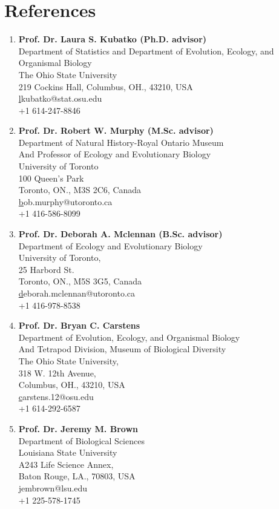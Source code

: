 \documentclass[11pt,letterpaper,sans]{moderncv} %
\begin{document}
\section{References}
\begin{enumerate}

\item \textbf{Prof. Dr. Laura S. Kubatko (Ph.D. advisor)}\\Department of Statistics and Department of Evolution, Ecology, and Organismal Biology\\The Ohio State University\\219 Cockins Hall, Columbus, OH., 43210, USA\\\href{lkubatko@stat.osu.edu}lkubatko@stat.osu.edu\\+1 614-247-8846\\

\item \textbf{Prof. Dr. Robert W. Murphy (M.Sc. advisor)}\\Department of Natural History-Royal Ontario Museum\\And Professor of Ecology and Evolutionary Biology\\ University of Toronto\\100 Queen’s Park\\Toronto, ON., M3S 2C6, Canada\\\href{bob.murphy@utoronto.ca}bob.murphy@utoronto.ca\\+1 416-586-8099\\

\item \textbf{Prof. Dr. Deborah A. Mclennan (B.Sc. advisor)}\\Department of Ecology and Evolutionary Biology\\University of Toronto,\\25 Harbord St.\\Toronto, ON., M5S 3G5, Canada \\\href{deborah.mclennan@utoronto.ca}deborah.mclennan@utoronto.ca\\+1 416-978-8538\\

\item \textbf{Prof. Dr. Bryan C. Carstens}\\ Department of Evolution, Ecology, and Organismal Biology\\ And Tetrapod Division, Museum of Biological Diversity\\The Ohio State University,\\318 W. 12th Avenue,\\Columbus, OH., 43210, USA\\\href{carstens.12@osu.edu}carstens.12@osu.edu\\+1 614-292-6587\\

\item \textbf{Prof. Dr. Jeremy M. Brown}\\ Department of Biological Sciences\\Louisiana State University\\ A243 Life Science Annex,\\ Baton Rouge, LA., 70803, USA\\\href{jembrown@lsu.edu}jembrown@lsu.edu\\ +1 225-578-1745
\end{enumerate}
\end{document}
